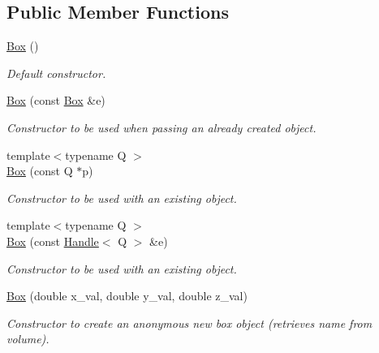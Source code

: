 \subsection*{Public Member Functions}
\begin{DoxyCompactItemize}
\item 
\hyperlink{class_d_d4hep_1_1_geometry_1_1_box_a62e8d6aff0c4e7f4d7ee515b117cca29}{Box} ()
\begin{DoxyCompactList}\small\item\em Default constructor. \item\end{DoxyCompactList}\item 
\hyperlink{class_d_d4hep_1_1_geometry_1_1_box_a25efab40f6803be3f4a803c0aaa536bf}{Box} (const \hyperlink{class_d_d4hep_1_1_geometry_1_1_box}{Box} \&e)
\begin{DoxyCompactList}\small\item\em Constructor to be used when passing an already created object. \item\end{DoxyCompactList}\item 
{\footnotesize template$<$typename Q $>$ }\\\hyperlink{class_d_d4hep_1_1_geometry_1_1_box_a69e271d2559a34b12ce114e565b5afa8}{Box} (const Q $\ast$p)
\begin{DoxyCompactList}\small\item\em Constructor to be used with an existing object. \item\end{DoxyCompactList}\item 
{\footnotesize template$<$typename Q $>$ }\\\hyperlink{class_d_d4hep_1_1_geometry_1_1_box_a6bf3baf101c4aa3ced9ada94ff42d651}{Box} (const \hyperlink{class_d_d4hep_1_1_handle}{Handle}$<$ Q $>$ \&e)
\begin{DoxyCompactList}\small\item\em Constructor to be used with an existing object. \item\end{DoxyCompactList}\item 
\hyperlink{class_d_d4hep_1_1_geometry_1_1_box_a81ef6c7eef4559047f89d4cd7ab10ca8}{Box} (double x\_\-val, double y\_\-val, double z\_\-val)
\begin{DoxyCompactList}\small\item\em Constructor to create an anonymous new box object (retrieves name from volume). \item\end{DoxyCompactList}\item 

\end{DoxyCompactItemize}
